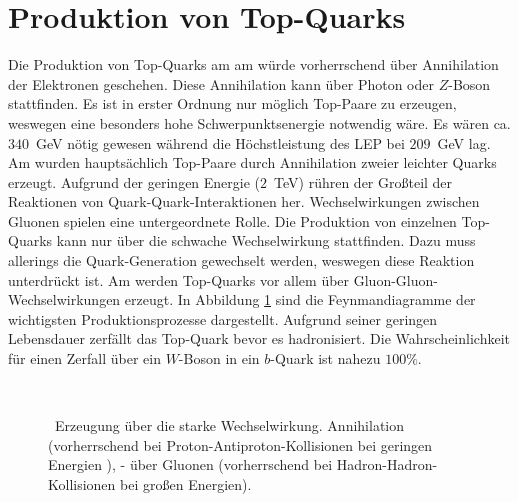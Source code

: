 \section{Produktion von Top-Quarks}
Die Produktion von Top-Quarks am \lep am \cern würde vorherrschend über Annihilation der Elektronen geschehen. Diese Annihilation kann über Photon oder $Z$-Boson stattfinden. Es ist in erster Ordnung nur möglich Top-Paare zu erzeugen, weswegen eine besonders hohe Schwerpunktsenergie notwendig wäre. Es wären ca. $340$~GeV nötig gewesen während die Höchstleistung des LEP bei $209$~GeV lag. Am \tevatron wurden hauptsächlich Top-Paare durch Annihilation zweier leichter Quarks erzeugt. Aufgrund der geringen Energie ($2$~TeV) rühren der Großteil der Reaktionen von Quark-Quark-Interaktionen her. Wechselwirkungen zwischen Gluonen spielen eine untergeordnete Rolle. Die Produktion von einzelnen Top-Quarks kann nur über die schwache Wechselwirkung stattfinden. Dazu muss allerings die Quark-Generation gewechselt werden, weswegen diese Reaktion unterdrückt ist. Am \lhc werden Top-Quarks vor allem über Gluon-Gluon-Wechselwirkungen erzeugt. In Abbildung \ref{fig:ttbar_prod_feyn} sind die Feynmandiagramme der wichtigsten Produktionsprozesse dargestellt. 
Aufgrund seiner geringen Lebensdauer zerfällt das Top-Quark bevor es hadronisiert. Die Wahrscheinlichkeit für einen Zerfall über ein $W$-Boson in ein $b$-Quark ist nahezu $100\%$.
\begin{figure}
	\centering
					\\

		\caption{\ttbar\ Erzeugung über die starke Wechselwirkung.  Annihilation (vorherrschend bei Proton-Antiproton-Kollisionen bei geringen Energien ), - über Gluonen (vorherrschend bei Hadron-Hadron-Kollisionen bei großen Energien)\cite{Lemmer:2014zua}. }
\label{fig:ttbar_prod_feyn}
\end{figure}


